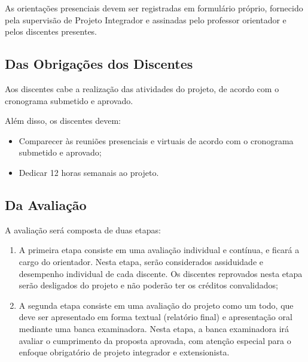 

As orientações presenciais devem ser registradas em formulário próprio, fornecido pela supervisão de Projeto Integrador e assinadas pelo professor orientador e pelos discentes presentes.

\subsection{Das Obrigações dos Discentes}

Aos discentes cabe a realização das atividades do projeto, de acordo com o cronograma submetido e aprovado.

Além disso, os discentes devem:

\begin{itemize}
    \item Comparecer às reuniões presenciais e virtuais de acordo com o cronograma submetido e aprovado;
    \item Dedicar 12 horas semanais ao projeto.

\end{itemize}

\subsection{Da Avaliação}

A avaliação será composta de duas etapas:

\begin{enumerate}

\item A primeira etapa consiste em uma avaliação individual e contínua, e ficará a cargo do orientador. Nesta etapa, serão considerados assiduidade e desempenho individual de cada discente. Os discentes reprovados nesta etapa serão desligados do projeto e não poderão ter os créditos convalidados;

\item A segunda etapa consiste em uma avaliação do projeto como um todo, que deve ser apresentado em forma textual (relatório final) e apresentação oral mediante uma banca examinadora. Nesta etapa, a banca examinadora irá avaliar o cumprimento da proposta aprovada, com atenção especial para o enfoque obrigatório de projeto integrador e extensionista.

\end{enumerate}

